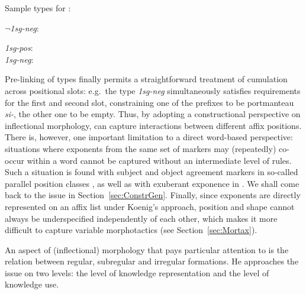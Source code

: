 \documentclass[output=paper,biblatex,babelshorthands,newtxmath,draftmode,colorlinks,citecolor=brown]{langscibook}
\begin{document}
\begin{exe}
\ex\label{ex-KoenigNegPast}
Sample types for :
\begin{xlist}
\ex \textit{$\neg$1sg-neg}:\\

\ex \textit{1sg-pos}:\\
\ex \textit{1sg-neg}:\\
\zl


Pre-linking of types finally permits a straightforward treatment of
cumulation across positional slots: e.g.\ the type \textit{1sg-neg}
simultaneously satisfies requirements for the first and second slot,
constraining one of the prefixes to be portmanteau \textit{si-}, the
other one to be empty. Thus, by adopting a constructional perspective
on inflectional morphology, \citet{Koenig99} can capture interactions
between different affix positions. There is, however, one important
limitation to a direct word-based perspective: situations where
exponents from the same set of markers may (repeatedly) co-occur
within a word cannot be captured without an intermediate level of
rules. Such a situation is found with subject and object agreement
markers in  \emdash so-called parallel position classes
\citep{Stump93,Crysmann:Bonami:2016} \emdash, as well as with exuberant
exponence in  \citep{Harris09,Crysmann:2018:Batsbi}. We shall
come back to the issue in Section~\ref{sec:ConstrGen}. Finally, since
exponents are directly represented on an affix list under Koenig's
approach, position and shape cannot always be underspecified
independently of each other, which makes it more difficult to
capture variable morphotactics (see Section~\ref{sec:Mortax}).


An aspect of (inflectional) morphology that \citet{Koenig99} pays
particular attention to is the relation between regular, subregular
and irregular formations. He approaches the issue on two levels: the
level of knowledge representation and the level of knowledge use. 


\end{xlist}
\end{exe}
\end{document}
